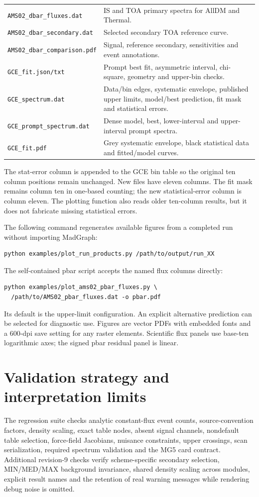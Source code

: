 \documentclass[11pt,a4paper]{article}
\begin{document}
\begin{longtable}{p{.43\linewidth}p{.49\linewidth}}
\texttt{AMS02\_dbar\_fluxes.dat} & IS and TOA primary spectra for AllDM and Thermal.\\
\texttt{AMS02\_dbar\_secondary.dat} & Selected secondary TOA reference curve.\\
\texttt{AMS02\_dbar\_comparison.pdf} & Signal, reference secondary, sensitivities and event annotations.\\
\texttt{GCE\_fit.json/txt} & Prompt best fit, asymmetric interval, chi-square, geometry and upper-bin checks.\\
\texttt{GCE\_spectrum.dat} & Data/bin edges, systematic envelope, published upper limits, model/best prediction, fit mask and statistical errors.\\
\texttt{GCE\_prompt\_spectrum.dat} & Dense model, best, lower-interval and upper-interval prompt spectra.\\
\texttt{GCE\_fit.pdf} & Grey systematic envelope, black statistical data and fitted/model curves.\\\bottomrule
\end{longtable}

The stat-error column is appended to the GCE bin table so the original ten column positions remain unchanged. New files have eleven columns. The fit mask remains column ten in one-based counting; the new statistical-error column is column eleven. The plotting function also reads older ten-column results, but it does not fabricate missing statistical errors.

The following command regenerates available figures from a completed run without importing MadGraph:
\begin{lstlisting}
python examples/plot_run_products.py /path/to/output/run_XX
\end{lstlisting}
The self-contained pbar script accepts the named flux columns directly:
\begin{lstlisting}
python examples/plot_ams02_pbar_fluxes.py \
  /path/to/AMS02_pbar_fluxes.dat -o pbar.pdf
\end{lstlisting}
Its default is the upper-limit configuration. An explicit alternative prediction can be selected for diagnostic use. Figures are vector PDFs with embedded fonts and a 600-dpi save setting for any raster elements. Scientific flux panels use base-ten logarithmic axes; the signed pbar residual panel is linear.

\section{Validation strategy and interpretation limits}
The regression suite checks analytic constant-flux event counts, source-convention factors, density scaling, exact table nodes, absent signal channels, nondefault table selection, force-field Jacobians, nuisance constraints, upper crossings, scan serialization, required spectrum validation and the MG5 card contract. Additional revision-9 checks verify scheme-specific secondary selection, MIN/MED/MAX background invariance, shared density scaling across modules, explicit result names and the retention of real warning messages while rendering debug noise is omitted.
\end{document}
